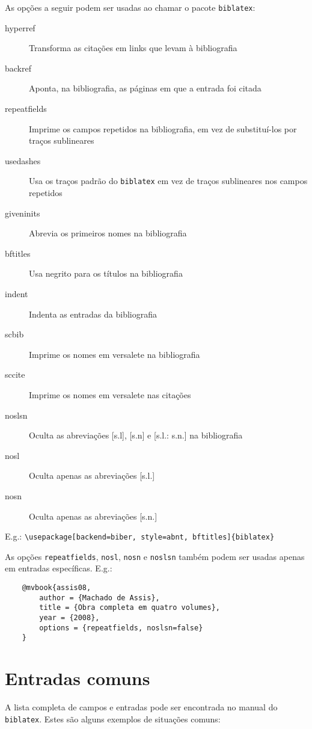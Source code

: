 \documentclass[a4paper]{article}
\begin{document}
As opções a seguir podem ser usadas ao chamar o pacote \texttt{biblatex}:

\begin{description}
    \item [hyperref] Transforma as citações em links que levam à bibliografia
    \item [backref] Aponta, na bibliografia, as páginas em que a entrada foi citada
    \item [repeatfields] Imprime os campos repetidos na bibliografia, em vez de substituí-los por traços sublineares
    \item [usedashes] Usa os traços padrão do \texttt{biblatex} em vez de traços sublineares nos campos repetidos
    \item [giveninits] Abrevia os primeiros nomes na bibliografia
    \item [bftitles] Usa negrito para os títulos na bibliografia
    \item [indent] Indenta as entradas da bibliografia
    \item [scbib] Imprime os nomes em versalete na bibliografia
    \item [sccite] Imprime os nomes em versalete nas citações
    \item [noslsn] Oculta as abreviações [s.l], [s.n] e [s.l.: s.n.] na bibliografia
    \item [nosl] Oculta apenas as abreviações [s.l.]
    \item [nosn] Oculta apenas as abreviações [s.n.]
\end{description}

E.g.: \verb"\usepackage[backend=biber, style=abnt, bftitles]{biblatex}"

As opções \texttt{repeatfields}, \texttt{nosl}, \texttt{nosn} e \texttt{noslsn} também podem ser usadas apenas em entradas específicas. E.g.:

\begin{verbatim}
    @mvbook{assis08,
        author = {Machado de Assis},
        title = {Obra completa em quatro volumes},
        year = {2008},
        options = {repeatfields, noslsn=false}
    }
\end{verbatim}


	
\clearpage
\section{Entradas comuns}

A lista completa de campos e entradas pode ser encontrada no manual do \texttt{biblatex}. Estes são alguns exemplos de situações comuns:
\end{document}

